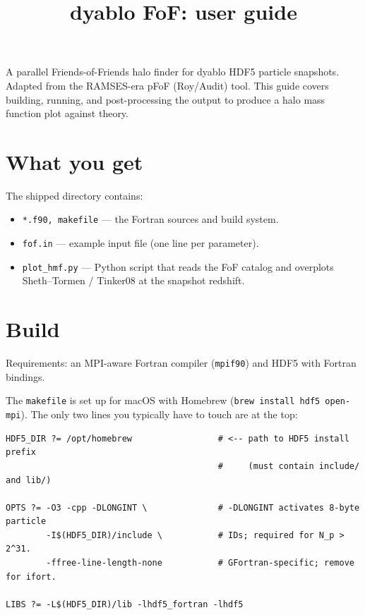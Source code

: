 \documentclass[11pt,a4paper]{article}
\title{\textbf{dyablo FoF: user guide}}
\author{}
\date{}
\begin{document}
\maketitle
\vspace{-2em}

\noindent
A parallel Friends-of-Friends halo finder for dyablo HDF5 particle snapshots.
Adapted from the RAMSES-era pFoF (Roy/Audit) tool. This guide covers building,
running, and post-processing the output to produce a halo mass function plot
against theory.

\section{What you get}

The shipped directory contains:
\begin{itemize}\itemsep0pt
  \item \texttt{*.f90, makefile} --- the Fortran sources and build system.
  \item \texttt{fof.in} --- example input file (one line per parameter).
  \item \texttt{plot\_hmf.py} --- Python script that reads the FoF catalog and
        overplots Sheth--Tormen / Tinker08 at the snapshot redshift.
\end{itemize}

\section{Build}

Requirements: an MPI-aware Fortran compiler (\texttt{mpif90}) and HDF5 with
Fortran bindings.

The \texttt{makefile} is set up for macOS with Homebrew (\texttt{brew install
hdf5 open-mpi}). The only two lines you typically have to touch are at the
top:

\begin{lstlisting}
HDF5_DIR ?= /opt/homebrew                 # <-- path to HDF5 install prefix
                                          #     (must contain include/ and lib/)

OPTS ?= -O3 -cpp -DLONGINT \              # -DLONGINT activates 8-byte particle
        -I$(HDF5_DIR)/include \           # IDs; required for N_p > 2^31.
        -ffree-line-length-none           # GFortran-specific; remove for ifort.

LIBS ?= -L$(HDF5_DIR)/lib -lhdf5_fortran -lhdf5
\end{lstlisting}
\end{document}
